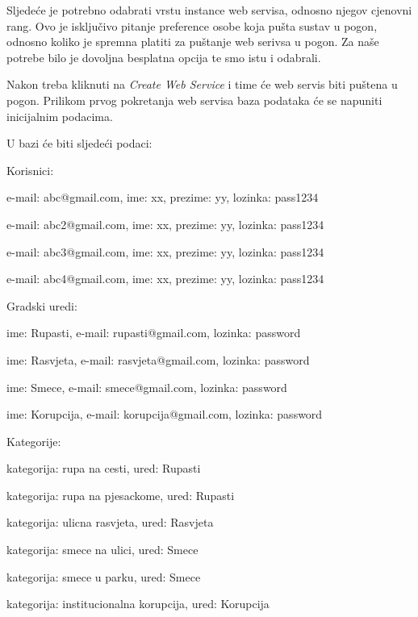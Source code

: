 			Sljedeće je potrebno odabrati vrstu instance web servisa, odnosno njegov cjenovni rang. Ovo je isključivo pitanje preference osobe koja pušta sustav u pogon, odnosno koliko je spremna platiti za puštanje web serivsa u pogon. Za naše potrebe bilo je dovoljna besplatna opcija te smo istu i odabrali.
			
			Nakon treba kliknuti na \textit{Create Web Service} i time će web servis biti puštena u pogon. Prilikom prvog pokretanja web servisa baza podataka će se napuniti inicijalnim podacima.
			
			U bazi će biti sljedeći podaci:
			\begin{packed_item}
				\item Korisnici:
				\begin{packed_item}
					\item e-mail: abc@gmail.com, ime: xx, prezime: yy, lozinka: pass1234
					\item e-mail: abc2@gmail.com, ime: xx, prezime: yy, lozinka: pass1234
					\item e-mail: abc3@gmail.com, ime: xx, prezime: yy, lozinka: pass1234
					\item e-mail: abc4@gmail.com, ime: xx, prezime: yy, lozinka: pass1234
				\end{packed_item}
				\item Gradski uredi:
				\begin{packed_item}
					\item ime: Rupasti, e-mail: rupasti@gmail.com, lozinka: password
					\item ime: Rasvjeta, e-mail: rasvjeta@gmail.com, lozinka: password
					\item ime: Smece, e-mail: smece@gmail.com, lozinka: password
					\item ime: Korupcija, e-mail: korupcija@gmail.com, lozinka: password
				\end{packed_item}
				\item Kategorije:
				\begin{packed_item}
					\item kategorija: rupa na cesti, ured: Rupasti
					\item kategorija: rupa na pjesackome, ured: Rupasti
					\item kategorija: ulicna rasvjeta, ured: Rasvjeta
					\item kategorija: smece na ulici, ured: Smece
					\item kategorija: smece u parku, ured: Smece
					\item kategorija: institucionalna korupcija, ured: Korupcija

\end{packed_item}
\end{packed_item}
